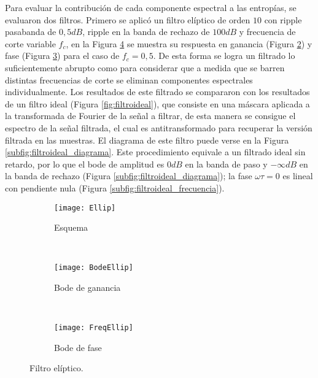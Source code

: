 Para evaluar la contribución de cada componente espectral a las entropías, se evaluaron dos filtros.
Primero se aplicó un filtro elíptico de orden $10$ con ripple pasabanda de $0,5 dB$, ripple en la banda de rechazo de $100 dB$ y frecuencia de corte variable $f_c$, en la Figura \ref{fig:filtroellip} se muestra su respuesta en ganancia (Figura \ref{subfig:filtroellip_amplitud}) y fase (Figura \ref{subfig:filtroellip_frecuencia}) para el caso de $f_c=0,5$. De esta forma se logra un filtrado lo suficientemente abrupto como para considerar que a medida que se barren distintas frecuencias de corte se eliminan componentes espectrales individualmente.
Los resultados de este filtrado se compararon con los resultados de un filtro ideal (Figura \ref{fig:filtroideal}), que consiste en una máscara aplicada a la transformada de Fourier de la señal a filtrar, de esta manera se consigue el espectro de la señal filtrada, el cual es antitransformado para recuperar la versión filtrada en las muestras. El diagrama de este filtro puede verse en la Figura \ref{subfig:filtroideal_diagrama}. Este procedimiento equivale a un filtrado ideal sin retardo, por lo que el bode de amplitud es $0dB$ en la banda de paso y $-\infty dB$ en la banda de rechazo (Figura \ref{subfig:filtroideal_diagrama}); la fase $\omega\tau=0$ es lineal con pendiente nula (Figura \ref{subfig:filtroideal_frecuencia}).
%
\begin{figure}[h]
    \centering
    \begin{subfigure}[t]{.49\textwidth}
        \texttt{[image: Ellip]}
        \caption{Esquema}
        \label{subfig:filtroellip_diagrama}
    \end{subfigure}
    ~ %
    \begin{subfigure}[t]{.49\textwidth}
        \texttt{[image: BodeEllip]}
        \caption{Bode de ganancia}
        \label{subfig:filtroellip_amplitud}
    \end{subfigure}
    ~ %
    \begin{subfigure}[t]{.49\textwidth}
        \texttt{[image: FreqEllip]}
        \caption{Bode de fase}
        \label{subfig:filtroellip_frecuencia}
    \end{subfigure}
    \caption{Filtro elíptico.}\label{fig:filtroellip}
\end{figure}
